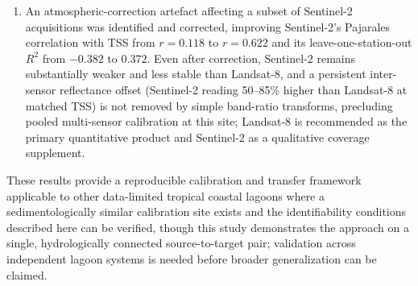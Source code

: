 \documentclass[remotesensing,article,submit,pdftex,moreauthors]{Definitions/mdpi}
\begin{document}
\begin{enumerate}
    \item An atmospheric-correction artefact affecting a subset of
    Sentinel-2 acquisitions was identified and corrected, improving
    Sentinel-2's Pajarales correlation with TSS from $r = 0.118$ to
    $r = 0.622$ and its leave-one-station-out $R^2$ from $-0.382$ to
    $0.372$. Even after correction, Sentinel-2 remains substantially
    weaker and less stable than Landsat-8, and a persistent
    inter-sensor reflectance offset (Sentinel-2 reading 50--85\% higher
    than Landsat-8 at matched TSS) is not removed by simple band-ratio
    transforms, precluding pooled multi-sensor calibration at this
    site; Landsat-8 is recommended as the primary quantitative product
    and Sentinel-2 as a qualitative coverage supplement.

\end{enumerate}
 
These results provide a reproducible calibration and transfer framework
applicable to other data-limited tropical coastal lagoons where a
sedimentologically similar calibration site exists and the
identifiability conditions described here can be verified, though this
study demonstrates the approach on a single, hydrologically connected
source-to-target pair; validation across independent lagoon systems is
needed before broader generalization can be claimed.

\vspace{6pt} 



\end{document}
